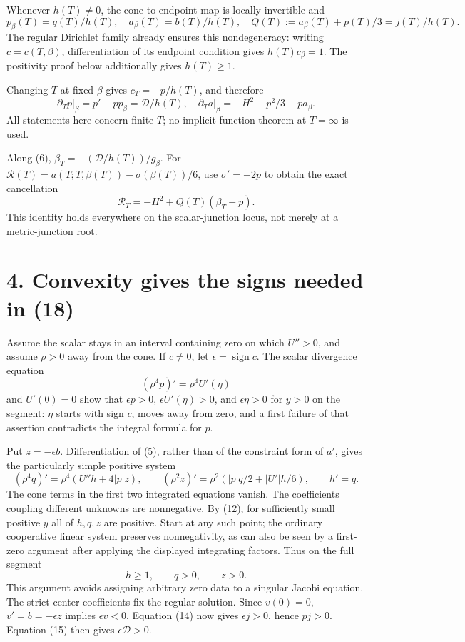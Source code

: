 \documentclass[11pt]{article}
\begin{document}
Whenever \(h(T)\ne0\), the cone-to-endpoint map is locally invertible and
\[
 p_\beta(T)=q(T)/h(T),\quad
 a_\beta(T)=b(T)/h(T),\quad
 Q(T):=a_\beta(T)+p(T)/3=j(T)/h(T).                 \tag{16}
\]
The regular Dirichlet family already ensures this nondegeneracy: writing
\(c=c(T,\beta)\), differentiation of its endpoint condition gives
\(h(T)c_\beta=1\). The positivity proof below additionally gives \(h(T)\geq1\).

Changing \(T\) at fixed \(\beta\) gives \(c_T=-p/h(T)\), and therefore
\[
 \partial_Tp\vert_\beta=p'-p p_\beta=\mathcal D/h(T),
 \quad
 \partial_Ta\vert_\beta=-H^2-p^2/3-p a_\beta.       \tag{17}
\]
All statements here concern finite \(T\); no implicit-function theorem at
\(T=\infty\) is used.

Along (6), \(\beta_T=-(\mathcal D/h(T))/g_\beta\). For
\(\mathscr R(T)=a(T;T,\beta(T))-\sigma(\beta(T))/6\), use
\(\sigma'=-2p\) to obtain the exact cancellation
\[
 \mathscr R_T=-H^2+Q(T)(\beta_T-p).                 \tag{18}
\]
This identity holds everywhere on the scalar-junction locus, not merely at a
metric-junction root.

\section{4. Convexity gives the signs needed in (18)}\label{convexity-gives-the-signs-needed-in-18}

Assume the scalar stays in an interval containing zero on which
\(U''>0\), and assume \(\rho>0\) away from the cone. If \(c\ne0\), let
\(\epsilon=\operatorname{sign}c\). The scalar divergence equation
\[
 (\rho^4p)'=\rho^4U'(\eta)
\]
and \(U'(0)=0\) show that \(\epsilon p>0\),
\(\epsilon U'(\eta)>0\), and \(\epsilon\eta>0\) for \(y>0\) on the segment:
\(\eta\) starts with sign \(c\), moves away from zero, and a first failure
of that assertion contradicts the integral formula for \(p\).

Put \(z=-\epsilon b\). Differentiation of (5), rather than of the constraint
form of \(a'\), gives the particularly simple positive system
\[
 (\rho^4q)'=\rho^4(U''h+4|p|z),\qquad
 (\rho^2z)'=\rho^2(|p|q/2+|U'|h/6),\qquad h'=q.    \tag{19}
\]
The cone terms in the first two integrated equations vanish. The coefficients
coupling different unknowns are nonnegative. By (12), for sufficiently small
positive \(y\) all of \(h,q,z\) are positive. Start at any such point; the
ordinary cooperative linear system preserves nonnegativity, as can also be
seen by a first-zero argument after applying the displayed integrating factors.
Thus on the full segment
\[
 h\geq1,\qquad q>0,\qquad z>0.
\]
This argument avoids assigning arbitrary zero data to a singular Jacobi
equation. The strict center coefficients fix the regular solution. Since
\(v(0)=0\), \(v'=b=-\epsilon z\) implies \(\epsilon v<0\).
Equation (14) now gives \(\epsilon j>0\), hence \(p j>0\).
Equation (15) then gives \(\epsilon\mathcal D>0\).
\end{document}
